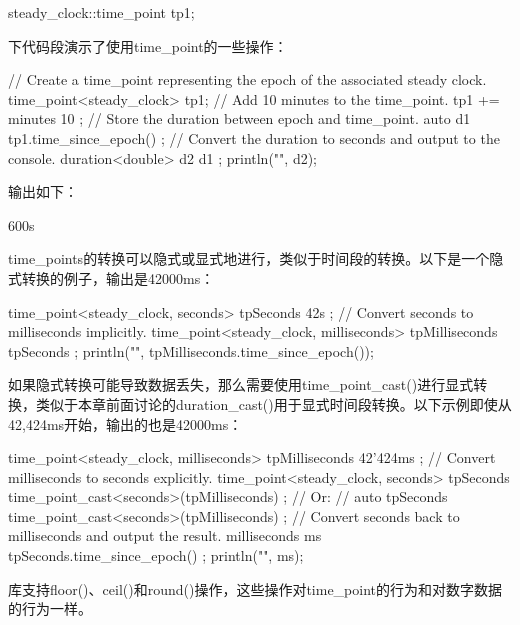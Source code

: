 \begin{cpp}
steady_clock::time_point tp1;
\end{cpp}

下代码段演示了使用time\_point的一些操作：

\begin{cpp}
// Create a time_point representing the epoch of the associated steady clock.
time_point<steady_clock> tp1;
// Add 10 minutes to the time_point.
tp1 += minutes { 10 };
// Store the duration between epoch and time_point.
auto d1 { tp1.time_since_epoch() };
// Convert the duration to seconds and output to the console.
duration<double> d2 { d1 };
println("{}", d2);
\end{cpp}

输出如下：

\begin{shell}
600s
\end{shell}

time\_points的转换可以隐式或显式地进行，类似于时间段的转换。以下是一个隐式转换的例子，输出是42000ms：

\begin{cpp}
time_point<steady_clock, seconds> tpSeconds { 42s };
// Convert seconds to milliseconds implicitly.
time_point<steady_clock, milliseconds> tpMilliseconds { tpSeconds };
println("{}", tpMilliseconds.time_since_epoch());
\end{cpp}

如果隐式转换可能导致数据丢失，那么需要使用time\_point\_cast()进行显式转换，类似于本章前面讨论的duration\_cast()用于显式时间段转换。以下示例即使从42,424ms开始，输出的也是42000ms：

\begin{cpp}
time_point<steady_clock, milliseconds> tpMilliseconds { 42'424ms };
// Convert milliseconds to seconds explicitly.
time_point<steady_clock, seconds> tpSeconds {
    time_point_cast<seconds>(tpMilliseconds) };
// Or:
// auto tpSeconds { time_point_cast<seconds>(tpMilliseconds) };
// Convert seconds back to milliseconds and output the result.
milliseconds ms { tpSeconds.time_since_epoch() };
println("{}", ms);
\end{cpp}

库支持floor()、ceil()和round()操作，这些操作对time\_point的行为和对数字数据的行为一样。
